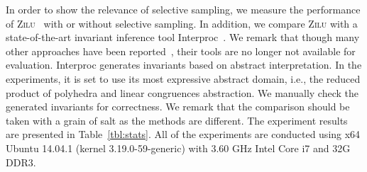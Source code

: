 In order to show the relevance of selective sampling, we measure the performance of \textsc{Zilu}~\cite{zilu:repo} with or without selective sampling. In addition, we compare \textsc{Zilu} with a state-of-the-art invariant inference tool Interproc~\cite{jeannet2010interproc}. We remark that though many other approaches have been reported~\cite{sharma2012interpolants,sharma2013verification,DBLP:conf/esop/0001GHALN13,sharma2014invariant}, their tools are no longer not available for evaluation.
Interproc generates invariants based on abstract interpretation. In the experiments, it is set to use its most expressive abstract domain, i.e., the reduced product of polyhedra and linear congruences abstraction. %
We manually check the generated invariants for correctness. %
We remark that the comparison should be taken with a grain of salt as the methods are different. The experiment results are presented in Table~\ref{tbl:stats}. All of the experiments are conducted using x64 Ubuntu 14.04.1 (kernel 3.19.0-59-generic) with 3.60 GHz Intel Core i7 and 32G DDR3.

